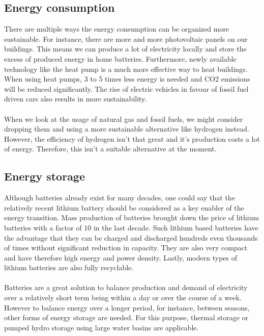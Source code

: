 \documentclass[../summary.tex]{subfiles}
\begin{document}
	\subsection{Energy consumption}
	
	There are multiple ways the energy consumption can be organized more sustainable. For instance, there are more and more photovoltaic panels on our buildings. This means we can produce a lot of electricity locally and store the excess of produced energy in home batteries. Furthermore, newly available technology like the heat pump is a much more effective way to heat buildings. When using heat pumps, 3 to 5 times less energy is needed and CO2 emissions will be reduced significantly. The rise of electric vehicles in favour of fossil fuel driven cars also results in more sustainability.
	\\\\
	When we look at the usage of natural gas and fossil fuels, we might consider dropping them and using a more sustainable alternative like hydrogen instead. However, the efficiency of hydrogen isn't that great and it's production costs a lot of energy. Therefore, this isn't a suitable alternative at the moment.
	
	\subsection{Energy storage}
	
	Although batteries already exist for many decades, one could say that the relatively recent lithium battery should be considered as a key enabler of the energy transition. Mass production of batteries brought down the price of lithium batteries with a factor of 10 in the last decade. Such lithium based batteries have the advantage that they can be charged and discharged hundreds even thousands of times without significant reduction in capacity. They are also very compact and have therefore high energy and power density. Lastly, modern types of lithium batteries are also fully recyclable. 
	\\\\
	Batteries are a great solution to balance production and demand of electricity over a relatively short term being within a day or over the course of a week. However to balance energy over a longer period, for instance, between seasons, other forms of energy storage are needed. For this purpose, thermal storage or pumped hydro storage using large water basins are applicable. 
	
\end{document}
